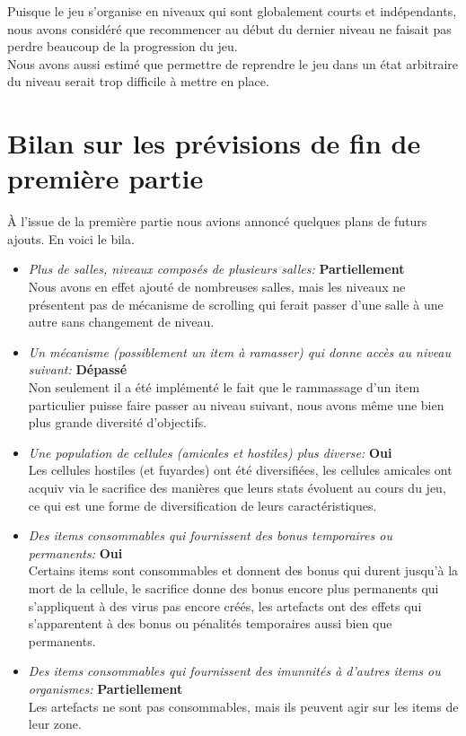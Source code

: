 \documentclass[a4paper,french]{article}
\begin{document}
Puisque le jeu s'organise en niveaux qui sont globalement courts et ind\'ependants, nous avons consid\'er\'e que recommencer au d\'ebut
du dernier niveau ne faisait pas perdre beaucoup de la progression du jeu.\\
Nous avons aussi estim\'e que permettre de reprendre le jeu dans un \'etat arbitraire du niveau serait trop difficile \`a mettre en place.


\section{Bilan sur les pr\'evisions de fin de premi\`ere partie}

\`A l'issue de la premi\`ere partie nous avions annonc\'e quelques plans de futurs ajouts. En voici le bila.

\begin{itemize}
    \item \textit{Plus de salles, niveaux compos\'es de plusieurs salles:} \textbf{Partiellement}\\
        Nous avons en effet ajout\'e de nombreuses salles, mais les niveaux ne pr\'esentent pas de m\'ecanisme de scrolling qui ferait passer d'une salle \`a une autre sans changement de niveau.

    \item \textit{Un m\'ecanisme (possiblement un item \`a ramasser) qui donne acc\`es au niveau suivant:} \textbf{D\'epass\'e}\\
        Non seulement il a \'et\'e impl\'ement\'e le fait que le rammassage d'un item particulier puisse faire passer au niveau suivant, nous avons m\^eme une bien plus grande diversit\'e d'objectifs.

    \item \textit{Une population de cellules (amicales et hostiles) plus diverse:} \textbf{Oui}\\
        Les cellules hostiles (et fuyardes) ont \'et\'e diversifi\'ees, les cellules amicales ont acquiv via le sacrifice des mani\`eres que leurs stats \'evoluent au cours du jeu, ce qui est une forme de diversification de leurs caract\'eristiques.

    \item \textit{Des items consommables qui fournissent des bonus temporaires ou permanents:} \textbf{Oui}\\
        Certains items sont consommables et donnent des bonus qui durent jusqu'\`a la mort de la cellule, le sacrifice donne des bonus encore plus permanents qui s'appliquent \`a des virus pas encore cr\'e\'es, les artefacts ont des effets qui s'apparentent \`a des bonus ou p\'enalit\'es temporaires aussi bien que permanents.

    \item \textit{Des items consommables qui fournissent des imunnit\'es \`a d'autres items ou organismes:} \textbf{Partiellement}\\
        Les artefacts ne sont pas consommables, mais ils peuvent agir sur les items de leur zone.
\end{itemize}
\end{document}
